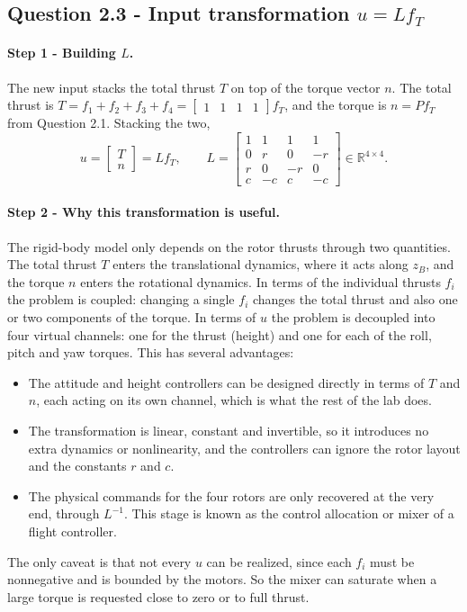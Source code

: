 \subsection*{Question 2.3 - Input transformation $u = L f_T$}

\paragraph{Step 1 - Building $L$.}
The new input stacks the total thrust $T$ on top of the torque vector $n$.
The total thrust is $T = f_1 + f_2 + f_3 + f_4 = \begin{bmatrix} 1 & 1 & 1 & 1 \end{bmatrix} f_T$, and the torque is $n = P f_T$ from Question 2.1.
Stacking the two,
\begin{equation*}
u = \begin{bmatrix} T \\ n \end{bmatrix} = L f_T, \qquad
L = \begin{bmatrix} 1 & 1 & 1 & 1 \\ 0 & r & 0 & -r \\ r & 0 & -r & 0 \\ c & -c & c & -c \end{bmatrix} \in \mathbb{R}^{4\times 4}.
\end{equation*}

\paragraph{Step 2 - Why this transformation is useful.}
The rigid-body model only depends on the rotor thrusts through two quantities.
The total thrust $T$ enters the translational dynamics, where it acts along $z_B$, and the torque $n$ enters the rotational dynamics.
In terms of the individual thrusts $f_i$ the problem is coupled: changing a single $f_i$ changes the total thrust and also one or two components of the torque.
In terms of $u$ the problem is decoupled into four virtual channels: one for the thrust (height) and one for each of the roll, pitch and yaw torques.
This has several advantages:
\begin{itemize}
\item The attitude and height controllers can be designed directly in terms of $T$ and $n$, each acting on its own channel, which is what the rest of the lab does.
\item The transformation is linear, constant and invertible, so it introduces no extra dynamics or nonlinearity, and the controllers can ignore the rotor layout and the constants $r$ and $c$.
\item The physical commands for the four rotors are only recovered at the very end, through $L^{-1}$. This stage is known as the control allocation or mixer of a flight controller.
\end{itemize}
The only caveat is that not every $u$ can be realized, since each $f_i$ must be nonnegative and is bounded by the motors.
So the mixer can saturate when a large torque is requested close to zero or to full thrust.

